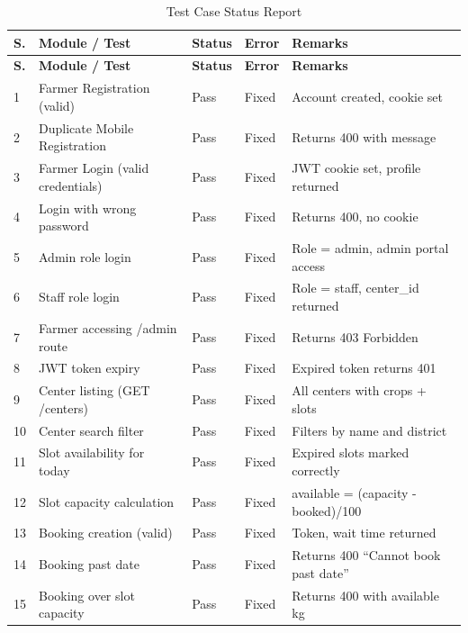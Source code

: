\begin{longtable}{|p{0.4cm}|p{3.8cm}|p{1.6cm}|p{1.5cm}|p{5.8cm}|}
\caption{Test Case Status Report}\label{tab:testcases}\\
\hline
\textbf{S.} & \textbf{Module / Test} & \textbf{Status} & \textbf{Error} & \textbf{Remarks} \\ \hline
\endfirsthead
\hline
\textbf{S.} & \textbf{Module / Test} & \textbf{Status} & \textbf{Error} & \textbf{Remarks} \\ \hline
\endhead
1  & Farmer Registration (valid)          & Pass & Fixed & Account created, cookie set \\ \hline
2  & Duplicate Mobile Registration        & Pass & Fixed & Returns 400 with message \\ \hline
3  & Farmer Login (valid credentials)     & Pass & Fixed & JWT cookie set, profile returned \\ \hline
4  & Login with wrong password            & Pass & Fixed & Returns 400, no cookie \\ \hline
5  & Admin role login                     & Pass & Fixed & Role = admin, admin portal access \\ \hline
6  & Staff role login                     & Pass & Fixed & Role = staff, center\_id returned \\ \hline
7  & Farmer accessing /admin route        & Pass & Fixed & Returns 403 Forbidden \\ \hline
8  & JWT token expiry                     & Pass & Fixed & Expired token returns 401 \\ \hline
9  & Center listing (GET /centers)        & Pass & Fixed & All centers with crops + slots \\ \hline
10 & Center search filter                 & Pass & Fixed & Filters by name and district \\ \hline
11 & Slot availability for today          & Pass & Fixed & Expired slots marked correctly \\ \hline
12 & Slot capacity calculation            & Pass & Fixed & available = (capacity - booked)/100 \\ \hline
13 & Booking creation (valid)             & Pass & Fixed & Token, wait time returned \\ \hline
14 & Booking past date                    & Pass & Fixed & Returns 400 ``Cannot book past date'' \\ \hline
15 & Booking over slot capacity           & Pass & Fixed & Returns 400 with available kg \\ \hline

\end{longtable}
